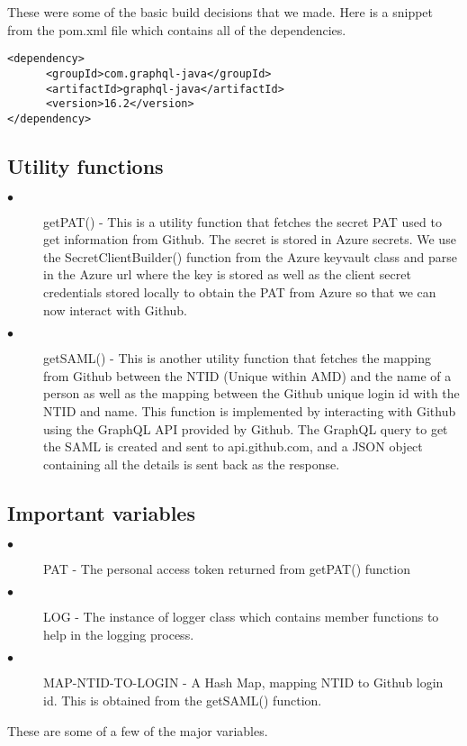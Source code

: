 These were some of the basic build decisions that we made.
Here is a snippet from the pom.xml file which contains all of the dependencies.

\begin{lstlisting}[breaklines]
<dependency>
      <groupId>com.graphql-java</groupId>
      <artifactId>graphql-java</artifactId>
      <version>16.2</version>
</dependency>
\end{lstlisting}

\subsection{Utility functions}

\begin{description}

\item[$\bullet$] getPAT() - This is a utility function that fetches the secret PAT used to get information from Github. The secret is stored in Azure secrets. We use the SecretClientBuilder() function from the Azure keyvault class and parse in the Azure url where the key is stored as well as the client secret credentials stored locally to obtain the PAT from Azure so that we can now interact with Github.

\item[$\bullet$] getSAML() - This is another utility function that fetches the mapping from Github between the NTID (Unique within AMD) and the name of a person as well as the mapping between the Github unique login id with the NTID and name. This function is implemented by interacting with Github using the GraphQL API provided by Github. The GraphQL query to get the SAML is created and sent to api.github.com, and a JSON object containing all the details is sent back as the response.


\end{description}

\subsection{Important variables}

\begin{description}

\item[$\bullet$] PAT - The personal access token returned from getPAT() function

\item[$\bullet$] LOG - The instance of logger class which contains member functions to help in the logging process.

\item[$\bullet$] MAP-NTID-TO-LOGIN - A Hash Map, mapping NTID to Github login id. This is obtained from the getSAML() function.

\end{description}
These are some of a few of the major variables.

